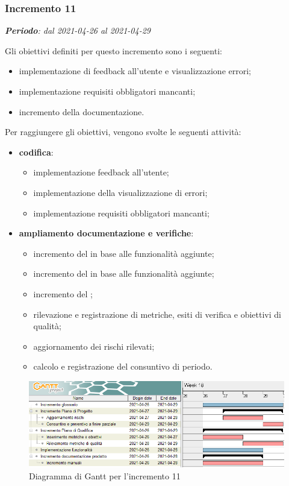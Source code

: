 \subsubsection{Incremento 11}
\textit{\textbf{Periodo}: dal 2021-04-26 al 2021-04-29}

Gli obiettivi definiti per questo incremento sono i seguenti:
\begin{itemize}
\item implementazione di feedback all'utente e visualizzazione errori;
\item implementazione requisiti obbligatori mancanti;
\item incremento della documentazione.
\end{itemize}

Per raggiungere gli obiettivi, vengono svolte le seguenti attività:
\begin{itemize}
\item \textbf{codifica}: 
\begin{itemize}
\item implementazione feedback all'utente;
\item implementazione della visualizzazione di errori;
\item implementazione requisiti obbligatori mancanti; 
\end{itemize} 

\item \textbf{ampliamento documentazione e verifiche}:
\begin{itemize}

\item incremento del  in base alle funzionalità aggiunte;
\item incremento del  in base alle funzionalità aggiunte;
\item incremento del ;
\item rilevazione e registrazione di metriche, esiti di verifica e obiettivi di qualità;
\item aggiornamento dei rischi rilevati;
\item calcolo e registrazione del consuntivo di periodo.
\end{itemize}

\end{itemize}
\begin{figure}[H]
\centering

\centerline{\includegraphics[scale=0.6]{res/Pianificazione/Fasi/VerificaIncrementi/ganttIncremento11}}
\caption{Diagramma di Gantt per l'incremento 11}
\end{figure}
